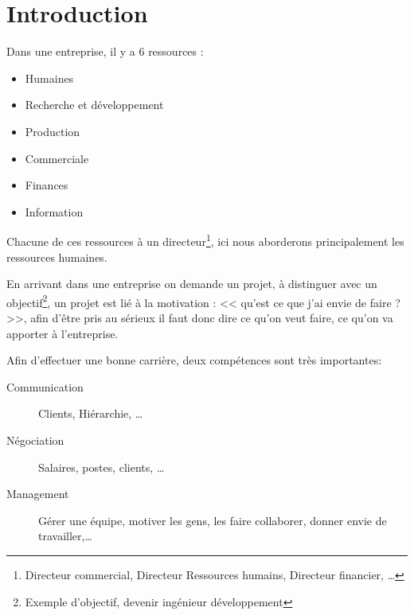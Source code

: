 \documentclass[12pt,a4paper,openany]{book}
\begin{document}
	\thispagestyle{empty} %
	\titleBC 
	\dominitoc
	\setcounter{tocdepth}{1}
	\setcounter{secnumdepth}{3}
	\setcounter{minitocdepth}{1}
	\tableofcontents
	\chapter*{Introduction}
	Dans une entreprise, il y a 6 ressources : 
	\begin{itemize}
		\item Humaines
		\item Recherche et développement
		\item Production 
		\item Commerciale
		\item Finances 
		\item Information
	\end{itemize}

	Chacune de ces ressources à un directeur\footnote{Directeur commercial, Directeur
	Ressources humains, Directeur financier, \ldots}, ici nous aborderons principalement
	les ressources humaines.

	En arrivant dans une entreprise on demande un projet, à distinguer avec un
	objectif\footnote{Exemple d'objectif, devenir ingénieur développement}, un projet est
	lié à la motivation : << qu'est ce que j'ai envie de faire ? >>, afin d'être pris au
	sérieux il faut donc dire ce qu'on veut faire, ce qu'on va apporter à
	l'entreprise.

	Afin d'effectuer une bonne carrière, deux compétences sont très importantes: 
	\begin{description}
		\item[Communication] Clients, Hiérarchie, \ldots
		\item[Négociation] Salaires, postes, clients, \ldots
		\item[Management] Gérer une équipe, motiver les gens, les faire collaborer, donner envie de travailler,\ldots
	\end{description}
\end{document}
